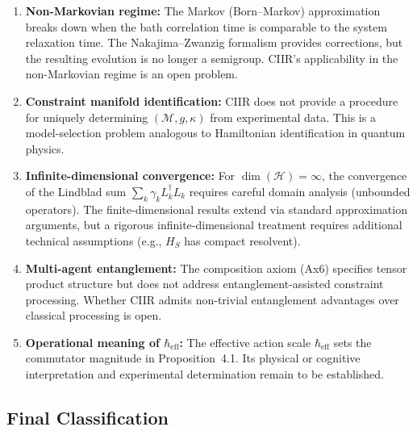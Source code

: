 \begin{enumerate}
\item \textbf{Non-Markovian regime:}  The Markov (Born--Markov)
  approximation breaks down when the bath correlation time is comparable
  to the system relaxation time.  The Nakajima--Zwanzig formalism
  provides corrections, but the resulting evolution is no longer
  a semigroup.  CIIR's applicability in the non-Markovian regime is
  an open problem.

\item \textbf{Constraint manifold identification:}  CIIR does not
  provide a procedure for uniquely determining $(\mathcal{M}, g, \kappa)$
  from experimental data.  This is a model-selection problem analogous
  to Hamiltonian identification in quantum physics.

\item \textbf{Infinite-dimensional convergence:}  For
  $\dim(\mathcal{H}) = \infty$, the convergence of the Lindblad sum
  $\sum_k \gamma_k L_k^\dagger L_k$ requires careful domain analysis
  (unbounded operators).  The finite-dimensional results
  extend via standard approximation arguments, but a rigorous
  infinite-dimensional treatment requires additional technical
  assumptions (e.g., $H_S$ has compact resolvent).

\item \textbf{Multi-agent entanglement:}  The composition axiom (Ax6)
  specifies tensor product structure but does not address
  entanglement-assisted constraint processing.  Whether CIIR admits
  non-trivial entanglement advantages over classical processing is
  open.

\item \textbf{Operational meaning of $\hbar_{\mathrm{eff}}$:}  The
  effective action scale $\hbar_{\mathrm{eff}}$ sets the commutator
  magnitude in Proposition~4.1.  Its physical or cognitive
  interpretation and experimental determination remain to be established.
\end{enumerate}

\subsection{Final Classification}

